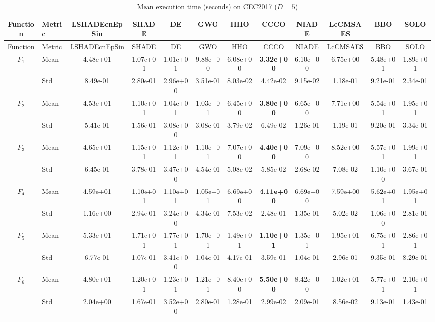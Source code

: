 \begin{center}
\small
\renewcommand{\arraystretch}{1.25}
\begin{longtable}{clcccccccccc}
\caption{Mean execution time (seconds) on CEC2017 ($D=5$) }
\label{tab:time_CEC2017_5} \\
\toprule
Function & Metric & LSHADEcnEpSin & SHADE & DE & GWO & HHO & CCCO & NIADE & LcCMSAES & BBO & SOLO \\
\midrule
\endfirsthead
\toprule
Function & Metric & LSHADEcnEpSin & SHADE & DE & GWO & HHO & CCCO & NIADE & LcCMSAES & BBO & SOLO \\
\midrule
\endhead
$F_{1}$ & Mean & 4.48e+01 & 1.07e+01 & 1.01e+01 & 9.88e+00 & 6.08e+00 & \textbf{3.32e+00} & 6.10e+00 & 6.75e+00 & 5.48e+01 & 1.89e+01 \\
 & Std & 8.49e-01 & 2.80e-01 & 2.96e+00 & 3.51e-01 & 8.03e-02 & 4.42e-02 & 9.15e-02 & 1.18e-01 & 9.21e-01 & 2.34e-01 \\
\midrule
$F_{2}$ & Mean & 4.53e+01 & 1.10e+01 & 1.04e+01 & 1.03e+01 & 6.45e+00 & \textbf{3.80e+00} & 6.65e+00 & 7.71e+00 & 5.54e+01 & 1.95e+01 \\
 & Std & 5.41e-01 & 1.56e-01 & 3.08e+00 & 3.08e-01 & 3.79e-02 & 6.49e-02 & 1.26e-01 & 1.19e-01 & 9.20e-01 & 3.34e-01 \\
\midrule
$F_{3}$ & Mean & 4.65e+01 & 1.15e+01 & 1.12e+01 & 1.10e+01 & 7.07e+00 & \textbf{4.40e+00} & 7.09e+00 & 8.52e+00 & 5.57e+01 & 1.99e+01 \\
 & Std & 6.45e-01 & 3.78e-01 & 3.47e+00 & 4.54e-01 & 5.08e-02 & 5.85e-02 & 2.68e-02 & 7.08e-02 & 1.10e+00 & 3.67e-01 \\
\midrule
$F_{4}$ & Mean & 4.59e+01 & 1.10e+01 & 1.10e+01 & 1.05e+01 & 6.69e+00 & \textbf{4.11e+00} & 6.69e+00 & 7.59e+00 & 5.62e+01 & 1.95e+01 \\
 & Std & 1.16e+00 & 2.94e-01 & 3.24e+00 & 4.34e-01 & 7.53e-02 & 2.48e-01 & 1.35e-01 & 5.02e-02 & 1.06e+00 & 2.81e-01 \\
\midrule
$F_{5}$ & Mean & 5.33e+01 & 1.71e+01 & 1.77e+01 & 1.70e+01 & 1.49e+01 & \textbf{1.10e+01} & 1.35e+01 & 1.95e+01 & 6.75e+01 & 2.86e+01 \\
 & Std & 6.77e-01 & 1.07e-01 & 3.41e+00 & 1.04e-01 & 4.17e-01 & 3.59e-01 & 1.04e-01 & 2.96e-01 & 9.35e-01 & 8.29e-01 \\
\midrule
$F_{6}$ & Mean & 4.80e+01 & 1.20e+01 & 1.23e+01 & 1.21e+01 & 8.40e+00 & \textbf{5.50e+00} & 8.42e+00 & 1.02e+01 & 5.77e+01 & 2.10e+01 \\
 & Std & 2.04e+00 & 1.67e-01 & 3.52e+00 & 2.80e-01 & 1.28e-01 & 2.99e-02 & 2.09e-01 & 8.56e-02 & 9.13e-01 & 1.43e-01 \\

\end{longtable}
\end{center}

